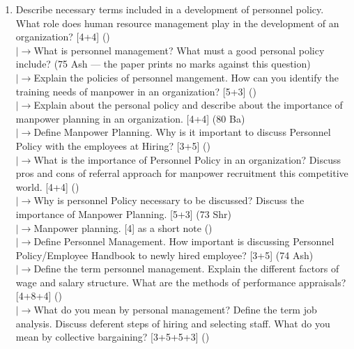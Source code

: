 \documentclass[12pt]{article}
\newcommand{\lb}{\\$\left|\rightarrow\right.$}
\begin{document}
\begin{enumerate}[topsep=0pt, noitemsep]
      \item Describe necessary terms included in a development of personnel policy. What role does human resource management play in the development of an organization? \hfill [4+4] ()
        \lb What is personnel management? What must a good personal policy include? \hfill (75 Ash --- the paper prints no marks against this question)
        \lb Explain the policies of personnel mangement. How can you identify the training needs of manpower in an organization? \hfill [5+3] ()
        \lb Explain about the personal policy and describe about the importance of manpower planning in an organization. \hfill [4+4] (80 Ba)
        \lb Define Manpower Planning. Why is it important to discuss Personnel Policy with the employees at Hiring? \hfill [3+5] ()
        \lb What is the importance of Personnel Policy in an organization? Discuss pros and cons of referral approach for manpower recruitment this competitive world. \hfill [4+4] ()
        \lb Why is personnel Policy necessary to be discussed? Discuss the importance of Manpower Planning. \hfill [5+3] (73 Shr)
        \lb Manpower planning. \hfill [4] as a short note ()
        \lb Define Personnel Management. How important is discussing Personnel Policy/Employee Handbook to newly hired employee? \hfill [3+5] (74 Ash)
        \lb Define the term personnel management. Explain the different factors of wage and salary structure. What are the methods of performance appraisals? \hfill [4+8+4] ()
        \lb What do you mean by personal management? Define the term job analysis. Discuss deferent steps of hiring and selecting staff. What do you mean by collective bargaining? \hfill [3+5+5+3] ()
    \end{enumerate}
\end{document}
